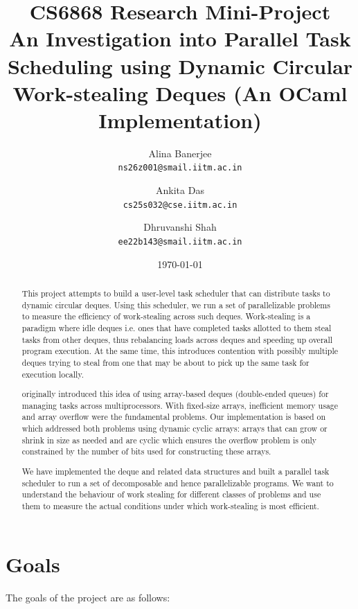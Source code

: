 \documentclass[11pt,a4paper]{article}
\title{%
  \textbf{CS6868 Research Mini-Project} \\[0.3em]
  \Large An Investigation into Parallel Task Scheduling using Dynamic
  Circular Work-stealing Deques (An OCaml Implementation)
}
\author{%
  Alina Banerjee \\ \texttt{ns26z001@smail.iitm.ac.in}
  \and
  Ankita Das \\ \texttt{cs25s032@cse.iitm.ac.in}
  \and
  Dhruvanshi Shah\\ \texttt{ee22b143@smail.iitm.ac.in}
}
\date{\today}
\begin{document}
\maketitle

\begin{abstract}

This project attempts to build a user-level task scheduler that can distribute
tasks to dynamic circular deques. Using this scheduler, we run a set of parallelizable
problems to measure
the efficiency of work-stealing across such deques. Work-stealing is a paradigm
where idle deques i.e. ones that have completed tasks allotted to them steal
tasks from other deques, thus rebalancing loads across deques and speeding up
overall program execution. At the same time, this introduces contention with
possibly multiple deques trying to steal from one that may be about to pick up
the same task for execution locally.

\cite{arora1998thread} originally introduced this idea of using array-based
deques (double-ended queues) for managing tasks across multiprocessors.
With fixed-size arrays, inefficient memory usage and array overflow were the
fundamental problems. Our
implementation is based on \cite{chase2005dynamic} which addressed both problems
using dynamic cyclic arrays: arrays that can grow or shrink in size as needed and
are cyclic which ensures the overflow problem is only constrained by the number
of bits used for constructing these arrays.

We have implemented the deque and related data structures and built a parallel task
scheduler to run a set of decomposable and hence parallelizable programs. We
want to understand the behaviour of work stealing for different classes of
problems and use them to measure the actual conditions under which work-stealing
is most efficient.

\end{abstract}

\section{Goals}
\label{sec:goals}

The goals of the project are as follows:
\end{document}
